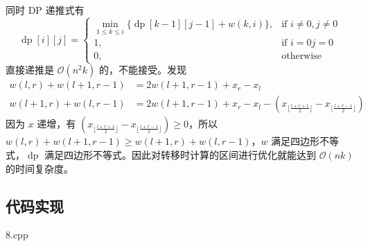 同时 DP 递推式有 \[
\operatorname{dp}[i][j]=
\left\{
\begin{array}{ll}
\min\limits_{1\le k\le i}\{\operatorname{dp}[k-1][j-1]+w(k,i)\},&\text{if } i\neq0,j\neq0\\
1,&\text{if }i=0 j=0\\
0,&\text{otherwise}
\end{array}
\right.
\] 直接递推是 \(\mathcal{O}(n^2k)\) 的，不能接受。发现 \[
\begin{aligned}
w(l,r)+w(l+1,r-1)&=2w(l+1,r-1)+x_r-x_l\\
w(l+1,r)+w(l,r-1)&=2w(l+1,r-1)+x_r-x_l-(x_{\lfloor \frac{l+r+1}{2}\rfloor}-x_{\lfloor \frac{l+r-1}{2}\rfloor})
\end{aligned}
\] 因为 \(x\) 递增，有
\((x_{\lfloor \frac{l+r+1}{2}\rfloor}-x_{\lfloor \frac{l+r-1}{2}\rfloor})\ge0\)，所以
\(w(l,r)+w(l+1,r-1)\ge w(l+1,r)+w(l,r-1)\)，\(w\)
满足四边形不等式，\(\operatorname{dp}\)
满足四边形不等式。因此对转移时计算的区间进行优化就能达到
\(\mathcal{O}(nk)\) 的时间复杂度。

\subsection{代码实现}

8.cpp
